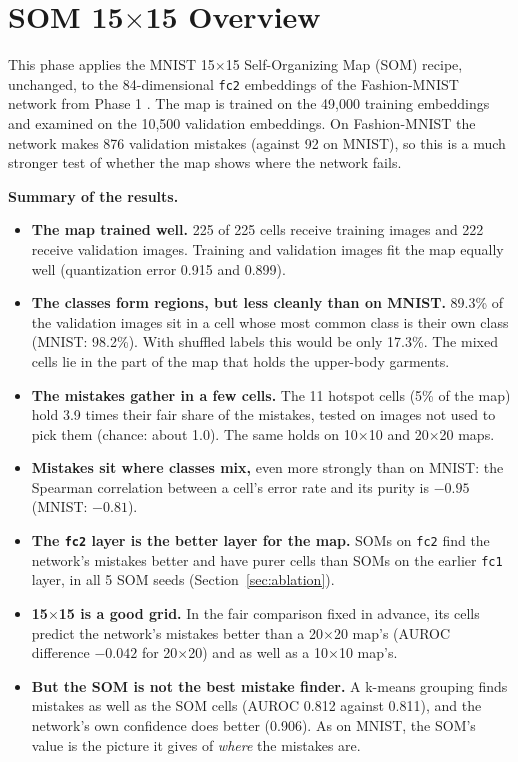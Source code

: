 \documentclass[11pt]{article}
\begin{document}
\setcounter{page}{2}
\newcommand{\tbd}{\textbf{[TBD]}}
\setlength{\emergencystretch}{3em}

\section{SOM 15$\times$15 Overview}

This phase applies the MNIST 15$\times$15 Self-Organizing Map (SOM) recipe, unchanged, to the 84-dimensional \texttt{fc2} embeddings of the Fashion-MNIST network from Phase 1 \cite{kohonen1990som,jafari_nnsom,xiao2017fashion}. The map is trained on the 49,000 training embeddings and examined on the 10,500 validation embeddings. On Fashion-MNIST the network makes 876 validation mistakes (against 92 on MNIST), so this is a much stronger test of whether the map shows where the network fails.

\textbf{Summary of the results.}
\begin{itemize}[leftmargin=1.4em, itemsep=1pt]
  \item \textbf{The map trained well.} 225 of 225 cells receive training images and 222 receive validation images. Training and validation images fit the map equally well (quantization error 0.915 and 0.899).
  \item \textbf{The classes form regions, but less cleanly than on MNIST.} 89.3\% of the validation images sit in a cell whose most common class is their own class (MNIST: 98.2\%). With shuffled labels this would be only 17.3\%. The mixed cells lie in the part of the map that holds the upper-body garments.
  \item \textbf{The mistakes gather in a few cells.} The 11 hotspot cells (5\% of the map) hold 3.9 times their fair share of the mistakes, tested on images not used to pick them (chance: about 1.0). The same holds on 10$\times$10 and 20$\times$20 maps.
  \item \textbf{Mistakes sit where classes mix,} even more strongly than on MNIST: the Spearman correlation between a cell's error rate and its purity is $-0.95$ (MNIST: $-0.81$).
  \item \textbf{The \texttt{fc2} layer is the better layer for the map.} SOMs on \texttt{fc2} find the network's mistakes better and have purer cells than SOMs on the earlier \texttt{fc1} layer, in all 5 SOM seeds (Section~\ref{sec:ablation}).
  \item \textbf{15$\times$15 is a good grid.} In the fair comparison fixed in advance, its cells predict the network's mistakes better than a 20$\times$20 map's (AUROC difference $-0.042$ for 20$\times$20) and as well as a 10$\times$10 map's.
  \item \textbf{But the SOM is not the best mistake finder.} A k-means grouping finds mistakes as well as the SOM cells (AUROC 0.812 against 0.811), and the network's own confidence does better (0.906). As on MNIST, the SOM's value is the picture it gives of \emph{where} the mistakes are.
\end{itemize}
\end{document}
